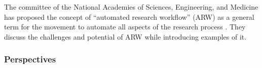 The committee of the National Academies of Sciences, Engineering, and Medicine has proposed the concept of ``automated research workflow'' (ARW) as a general term for the movement to automate all aspects of the research process \cite{national2022automated}. They discuss the challenges and potential of ARW while introducing examples of it.

\subsubsection{Perspectives}

